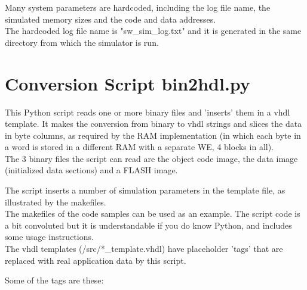     Many system parameters are hardcoded, including the log file name, the
    simulated memory sizes and the code and data addresses.\\

    The hardcoded log file name is "sw\_sim\_log.txt" and it is generated in the 
    same directory from which the simulator is run.\\

\section{Conversion Script bin2hdl.py}
\label{python_script}

    This Python script reads one or more binary files and 'inserts' them in a 
    vhdl template. It makes the
    conversion from binary to vhdl strings and slices the data in byte columns,
    as required by the RAM implementation (in which each byte in a word is
    stored in a different RAM with a separate WE, 4 blocks in all).\\
    
    The 3 binary files the script can read are the object code image, the 
    data image (initialized data sections) and a FLASH image.
    
    The script inserts a number of simulation parameters in the template file,
    as illustrated by the makefiles.\\
    
    The makefiles of the code samples can be used as an example. The script code
    is a bit convoluted but it is understandable if you do know Python, 
    and includes some usage instructions.\\

    The vhdl templates (/src/*\_template.vhdl) have placeholder 'tags' that are
    replaced with real application data by this script.

    Some of the tags are these:

